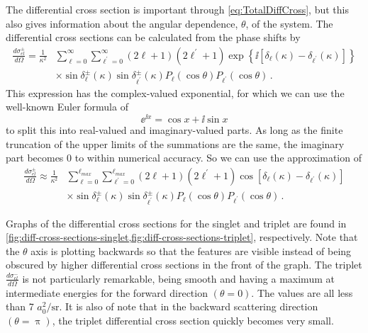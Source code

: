 \documentclass[Dissertation.tex]{subfiles}
\begin{document}
The differential cross section is important through \cref{eq:TotalDiffCross},
but this also gives information about the angular dependence, $\theta$, of the
system. The differential cross sections can be calculated from the phase shifts by
\begin{align}
\label{eq:DiffCross}
\nonumber \frac{d\sigma_{el}^\pm}{d\Omega} = \frac{1}{\kappa^2} & \sum_{\ell=0}^\infty \sum_{\ell^\prime=0}^\infty (2\ell+1)(2\ell^\prime+1) \exp\left\{\ii \left[\delta_\ell(\kappa) - \delta_{\ell^\prime}(\kappa) \right] \right\} \\
& \times \sin\delta_\ell^\pm(\kappa) \sin\delta_{\ell^\prime}^\pm(\kappa) P_\ell(\cos\theta) P_{\ell^\prime}(\cos\theta)\,.
\end{align}
This expression has the complex-valued exponential, for which we can use the
well-known Euler formula of
\begin{equation}
\label{eq:ComplexExp}
\ee^{\ii x} = \cos x + \ii \sin x
\end{equation}
to split this into real-valued and imaginary-valued parts. As long as the
finite truncation of the upper limits of the summations are the same, the
imaginary part becomes 0 to within numerical accuracy. So we can use the
approximation of
\begin{align}
\label{eq:DiffCross1}
\nonumber \frac{d\sigma_{el}^\pm}{d\Omega} \approx \frac{1}{\kappa^2} & \sum_{\ell=0}^{\ell_{max}} \sum_{\ell^\prime=0}^{\ell_{max}} (2\ell+1)(2\ell^\prime+1) \cos \left[\delta_\ell(\kappa) - \delta_{\ell^\prime}(\kappa) \right] \\
& \times \sin\delta_\ell^\pm(\kappa) \sin\delta_{\ell^\prime}^\pm(\kappa) P_\ell(\cos\theta) P_{\ell^\prime}(\cos\theta)\,.
\end{align}

Graphs of the differential cross sections for the singlet and triplet are found
in \cref{fig:diff-cross-sections-singlet,fig:diff-cross-sections-triplet},
respectively. Note that the $\theta$ axis is plotting backwards so that the
features are visible instead of being obscured by higher differential cross
sections in the front of the graph.
The triplet $\frac{d\sigma_{el}^-}{d\Omega}$ is not particularly
remarkable, being smooth and having a maximum at intermediate energies for the
forward direction $(\theta = 0)$. The values are all less than 7 $a_0^2/\textrm{sr}$.
It is also of note that in the backward scattering direction $(\theta = \uppi)$,
the triplet differential cross section quickly becomes very small.
\end{document}

